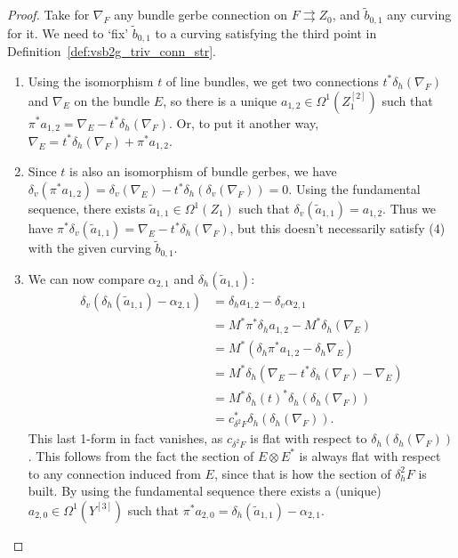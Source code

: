 \documentclass[12pt]{amsart}
\theoremstyle{plain}
\theoremstyle{definition}
\theoremstyle{remark}
\numberwithin{equation}{section}
\newcommand{\<}{\langle}
\renewcommand{\>}{\rangle}
\begin{document}
\begin{proof}
Take for $\nabla_F$ any bundle gerbe connection on $F\rightrightarrows Z_0$, and $\tilde b_{0,1}$ any curving for it. 
We need to `fix' $\tilde b_{0,1}$ to a curving satisfying the third point in Definition~\ref{def:vsb2g_triv_conn_str}.



\begin{enumerate}
\item Using the isomorphism $t$ of line bundles, we get two connections $t^*\delta_h(\nabla_F)$ and $\nabla_E$ on the bundle $E$, so there is a unique $a_{1,2} \in \Omega^1(Z_1^{[2]})$ such that $\pi^*a_{1,2} = \nabla_E - t^*\delta_h(\nabla_F)$. Or, to put it another way, $\nabla_E = t^*\delta_h(\nabla_F) + \pi^*a_{1,2}$.

\item Since $t$ is also an isomorphism of bundle gerbes, we have $\delta_v(\pi^*a_{1,2}) = \delta_v(\nabla_E) - t^*\delta_h(\delta_v(\nabla_F)) = 0$. Using the fundamental sequence, there exists $\tilde a_{1,1} \in \Omega^1(Z_1)$ such that $\delta_v(\tilde a_{1,1}) = a_{1,2}$. 
Thus we have $\pi^*\delta_v(\tilde a_{1,1}) = \nabla_E - t^*\delta_h(\nabla_F)$, but this doesn't necessarily satisfy (4) with the given curving $\tilde b_{0,1}$.


\item We can now compare $\alpha_{2,1}$ and $\delta_h(\tilde a_{1,1})$:
\begin{align*}
\delta_v(\delta_h (\tilde a_{1,1}) - \alpha_{2,1}) 
& = \delta_h a_{1,2} - \delta_v\alpha_{2,1}\\
& = M^*\pi^*\delta_h a_{1,2} - M^* \delta_h(\nabla_E)\\
& = M^*(\delta_h\pi^*a_{1,2} - \delta_h\nabla_E)\\
& = M^*\delta_h(\nabla_E - t^*\delta_h(\nabla_F)-\nabla_E)\\
& = M^*\delta_h(t)^*\delta_h(\delta_h(\nabla_F))\\
& = c_{\delta^2F}^*\delta_h(\delta_h(\nabla_F)).
\end{align*}
This last 1-form in fact vanishes, as $c_{\delta^2F}$ is flat with respect to $\delta_h(\delta_h(\nabla_F))$. 
This follows from the fact the section of $E\otimes E^*$ is always flat with respect to any connection induced from $E$, since that is how the section of $\delta_h^2F$ is built.
By using the fundamental sequence there exists a (unique) $a_{2,0} \in \Omega^1(Y^{[3]})$ such that $\pi^*a_{2,0} = \delta_h(\tilde a_{1,1}) - \alpha_{2,1}$.


\end{enumerate}
\end{proof}
\end{document}
